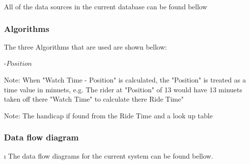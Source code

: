 All of the data sources in the current database can be found bellow




\subsubsection{Algorithms}
The three Algorithms that are used are shown bellow:

\begin{algorithm}[H]
\label{fig:Ride Time Algorithm}
	\caption{$Ride Time Algorithum$}
\begin{algorithmic}[1]
-{$Position$}
\end{algorithmic}
\end{algorithm}

Note: When "Watch Time - Position" is calculated, the "Position" is treated as a time value in minuets, e.g. The rider at "Position" of 13 would have 13 minuets taken off there "Watch Time" to calculate there Ride Time"

\begin{algorithm}[H]
\label{fig:Time Sort Algorithm}
	\caption{$Time Sort Algorithm$}
\begin{algorithmic}[2]
		\EndIf
	\EndFor
\EndWhile
\end{algorithmic}
\end{algorithm}

\begin{algorithm}[H]
\label{fig:Handicap Time Algorithm}
	\caption{$Handicap Time Algorithm$}
\begin{algorithmic}[3]
\end{algorithmic}
\end{algorithm}

Note: The handicap if found from the Ride Time and a look up table
\subsubsection{Data flow diagram}\i
The data flow diagrams for the current system can be found bellow.

